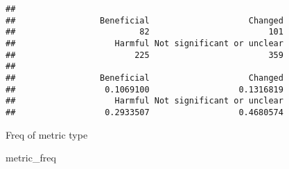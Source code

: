 \documentclass[
]{article}
\newenvironment{Shaded}{\begin{snugshade}}{\end{snugshade}}
\newcommand{\KeywordTok}[1]{\textcolor[rgb]{0.13,0.29,0.53}{\textbf{#1}}}
\newcommand{\NormalTok}[1]{#1}
\newcommand{\OperatorTok}[1]{\textcolor[rgb]{0.81,0.36,0.00}{\textbf{#1}}}
\begin{document}
\begin{Shaded}
\end{Shaded}

\begin{verbatim}
## 
##                 Beneficial                    Changed 
##                         82                        101 
##                    Harmful Not significant or unclear 
##                        225                        359 
## 
##                 Beneficial                    Changed 
##                  0.1069100                  0.1316819 
##                    Harmful Not significant or unclear 
##                  0.2933507                  0.4680574
\end{verbatim}

Freq of metric type

\begin{Shaded}
\begin{Highlighting}[]
\NormalTok{metric_freq }
\end{Highlighting}
\end{Shaded}
\end{document}
